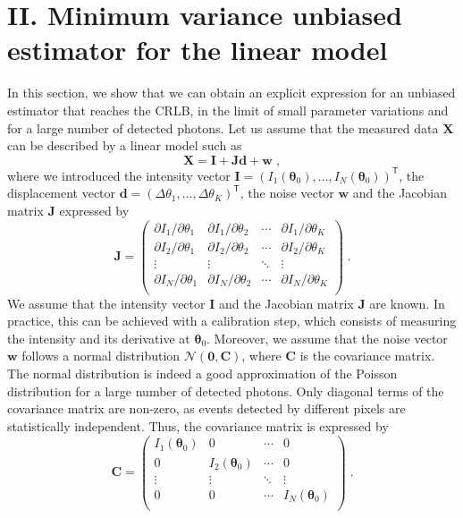 \documentclass[aps,prl,twocolumn,amsmath,amssymb,superscriptaddress,10pt,nobibnotes]{revtex4-2}
\renewcommand{\bm}[1]{\boldsymbol{\mathbf{#1}}}
\begin{document}
\section{II. Minimum variance unbiased estimator for the linear model}

In this section, we show that we can obtain an explicit expression for an unbiased estimator that reaches the CRLB, in the limit of small parameter variations and for a large number of detected photons. Let us assume that the measured data $\bm{X}$ can be described by a linear model such as
\begin{equation}
\bm{X} = \bm{I} + \bm{J} \bm{d} + \bm{w} \; ,
\end{equation}
where we introduced the intensity vector $\bm{I}=(I_1(\bm{\theta}_0),\dots,I_N(\bm{\theta}_0))^\mathsf{T}$, the displacement vector $\bm{d}=(\Delta \theta_1,\dots,\Delta \theta_K)^\mathsf{T}$, the noise vector $\bm{w}$ and the Jacobian matrix $\bm{J}$ expressed by
\begin{equation}
\bm{J} = \begin{pmatrix}
\partial I_1/\partial \theta_1 & \partial I_1/\partial \theta_2 & \cdots & \partial I_1/\partial \theta_K \\
\partial I_2/\partial \theta_1 & \partial I_2/\partial \theta_2 & \cdots & \partial I_2/\partial \theta_K \\
\vdots & \vdots & \ddots &\vdots \\
\partial I_N/\partial \theta_1 & \partial I_N/\partial \theta_2 & \cdots & \partial I_N/\partial \theta_K \\
\end{pmatrix} \; .
\end{equation}
We assume that the intensity vector $\bm{I}$ and the Jacobian matrix $\bm{J}$ are known. In practice, this can be achieved with a calibration step, which consists of measuring the intensity and its derivative at $\bm{\theta}_0$. Moreover, we assume that the noise vector $\bm{w}$ follows a normal distribution $\mathcal{N}(\bm{0},\bm{C})$, where $\bm{C}$ is the covariance matrix. The normal distribution is indeed a good approximation of the Poisson distribution for a large number of detected photons. Only diagonal terms of the covariance matrix are non-zero, as events detected by different pixels are statistically independent. Thus, the covariance matrix is expressed by
\begin{equation}
\bm{C} = \begin{pmatrix}
I_1(\bm{\theta}_0) & 0 & \cdots & 0 \\
0 & I_2(\bm{\theta}_0) & \cdots & 0 \\
\vdots & \vdots & \ddots &\vdots \\
0 & 0 & \cdots & I_N(\bm{\theta}_0) \\
\end{pmatrix} \; .
\end{equation}
\end{document}
